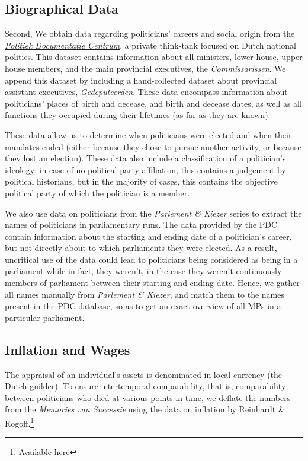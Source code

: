 \subsection{Biographical Data}
Second, We obtain data regarding politicians' careers and social origin from the \href{www.pdc.nl}{\textit{Politiek Documentatie Centrum}}, a private think-tank focused on Dutch national politics. This dataset contains information about all ministers, lower house, upper house members, and the main provincial executives, the \textit{Commissarissen}. We append this dataset by including a hand-collected dataset about provincial assistant-executives, \textit{Gedeputeerden}. These data encompass information about politicians' places of birth and decease, and birth and decease dates, as well as all functions they occupied during their lifetimes (as far as they are known). 

These data allow us to determine when politicians were elected and when their mandates ended (either because they chose to pursue another activity, or because they lost an election). These data also include a classification of a politician's ideology: in case of no political party affiliation, this contains a judgement by political historians, but in the majority of cases, this contains the objective political party of which the politician is a member. 

We also use data on politicians from the \textit{Parlement \& Kiezer} series to extract the names of politicians in parliamentary runs. The data provided by the PDC contain information about the starting and ending date of a politician's career, but not directly about to which parliaments they were elected. As a result, uncritical use of the data could lead to politicians being considered as being in a parliament while in fact, they weren't, in the case they weren't continuously members of parliament between their starting and ending date. Hence, we gather all names manually from \textit{Parlement \& Kiezer}, and match them to the names present in the PDC-database, so as to get an exact overview of all MPs in a particular parliament. 

\subsection{Inflation and Wages}
The appraisal of an individual's assets is denominated in local currency (the Dutch guilder). To ensure intertemporal comparability, that is, comparability between politicians who died at various points in time, we deflate the numbers from the \textit{Memories van Successie} using the data on inflation by Reinhardt \& Rogoff.\footnote{Available \href{https://carmenreinhart.com/2020/02/netherlands/}{here}}

